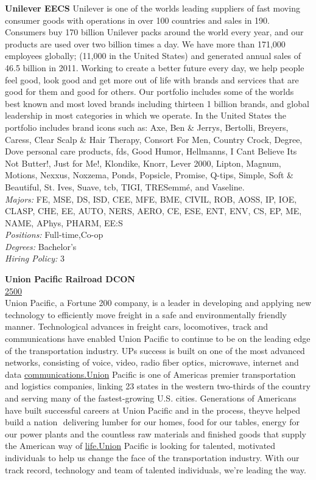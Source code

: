 \documentclass[twoside]{article}
\begin{document}
\begin{center}
\begin{multicols}{2}
\begin{minipage}{.95\columnwidth}{\Large\bf Unilever \hfill EECS}
    Unilever is one of the worlds leading suppliers of fast moving consumer goods with operations in over 100 countries and sales in 190. Consumers buy 170 billion Unilever packs around the world every year, and our products are used over two billion times a day. We have more than 171,000 employees globally; (11,000 in the United States) and generated annual sales of 46.5 billion in 2011. Working to create a better future every day, we help people feel good, look good and get more out of life with brands and services that are good for them and good for others. Our portfolio includes some of the worlds best known and most loved brands including thirteen 1 billion brands, and global leadership in most categories in which we operate. In the United States the portfolio includes brand icons such as: Axe, Ben \& Jerrys, Bertolli, Breyers, Caress, Clear Scalp \& Hair Therapy, Consort For Men, Country Crock, Degree, Dove personal care products, fds, Good Humor, Hellmanns, I Cant Believe Its Not Butter!, Just for Me!, Klondike, Knorr, Lever 2000, Lipton, Magnum, Motions, Nexxus, Noxzema, Ponds, Popsicle, Promise, Q-tips, Simple, Soft \& Beautiful, St. Ives, Suave, tcb, TIGI, TRESemmé, and Vaseline.\\
    \emph{Majors:} FE, MSE, DS, ISD, CEE, MFE, BME, CIVIL, ROB, AOSS, IP, IOE, CLASP, CHE, EE, AUTO, NERS, AERO, CE, ESE, ENT, ENV, CS, EP, ME, NAME, APhys, PHARM, EE:S\\
    \emph{Positions:} Full-time,Co-op\\
    \emph{Degrees:} Bachelor's\\
    \emph{Hiring Policy:} 3\\
\end{minipage}
 \begin{minipage}{.95\columnwidth}{\Large\bf Union Pacific Railroad \hfill DCON}\\
    \url{2500}\\
    Union Pacific, a Fortune 200 company, is a leader in developing and applying new technology to efficiently move freight in a safe and environmentally friendly manner. Technological advances in freight cars, locomotives, track and communications have enabled Union Pacific to continue to be on the leading edge of the transportation industry. UPs success is built on one of the most advanced networks, consisting of voice, video, radio fiber optics, microwave, internet and data \url{communications.Union} Pacific is one of Americas premier transportation and logistics companies, linking 23 states in the western two-thirds of the country and serving many of the fastest-growing U.S. cities. Generations of Americans have built successful careers at Union Pacific and in the process, theyve helped build a nation  delivering lumber for our homes, food for our tables, energy for our power plants and the countless raw materials and finished goods that supply the American way of \url{life.Union} Pacific is looking for talented, motivated individuals to help us change the face of the transportation industry. With our track record, technology and team of talented individuals, we're leading the way.\\

\end{minipage}
\end{multicols}
\end{center}
\end{document}
